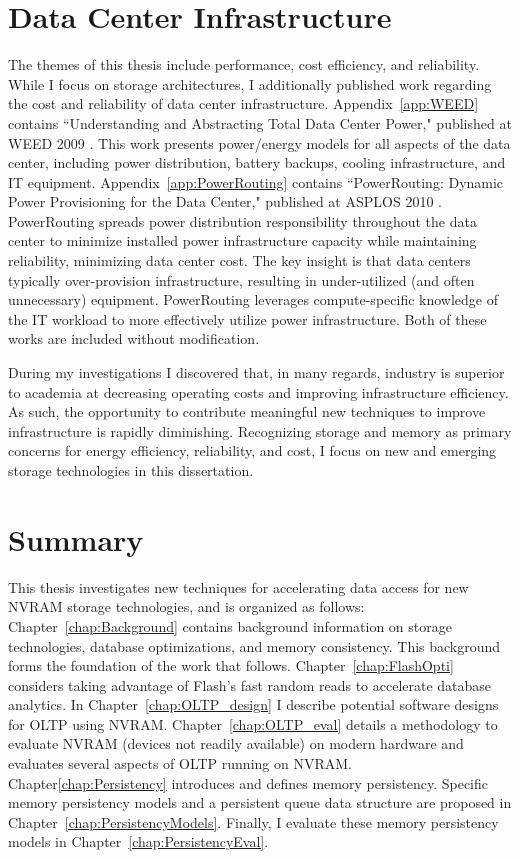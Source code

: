 \section{Data Center Infrastructure}
\label{sec:Intro:Additional}
The themes of this thesis include performance, cost efficiency, and reliability.
While I focus on storage architectures, I additionally published work regarding the cost and reliability of data center infrastructure.
Appendix~\ref{app:WEED} contains ``Understanding and Abstracting Total Data Center Power," published at WEED 2009 \cite{PelleyMeisner09}.
This work presents power/energy models for all aspects of the data center, including power distribution, battery backups, cooling infrastructure, and IT equipment.
Appendix~\ref{app:PowerRouting} contains ``PowerRouting: Dynamic Power Provisioning for the Data Center," published at ASPLOS 2010 \cite{PelleyMeisner10}.
PowerRouting spreads power distribution responsibility throughout the data center to minimize installed power infrastructure capacity while maintaining reliability, minimizing data center cost.
The key insight is that data centers typically over-provision infrastructure, resulting in under-utilized (and often unnecessary) equipment.
PowerRouting leverages compute-specific knowledge of the IT workload to more effectively utilize power infrastructure.
Both of these works are included without modification.

During my investigations I discovered that, in many regards, industry is superior to academia at decreasing operating costs and improving infrastructure efficiency.
As such, the opportunity to contribute meaningful new techniques to improve infrastructure is rapidly diminishing.
Recognizing storage and memory as primary concerns for energy efficiency, reliability, and cost, I focus on new and emerging storage technologies in this dissertation.

\section{Summary}
\label{sec:Intro:Summary}
This thesis investigates new techniques for accelerating data access for new NVRAM storage technologies, and is organized as follows:
Chapter~\ref{chap:Background} contains background information on storage technologies, database optimizations, and memory consistency.
This background forms the foundation of the work that follows.
Chapter~\ref{chap:FlashOpti} considers taking advantage of Flash's fast random reads to accelerate database analytics.
In Chapter~\ref{chap:OLTP_design} I describe potential software designs for OLTP using NVRAM.
Chapter~\ref{chap:OLTP_eval} details a methodology to evaluate NVRAM (devices not readily available) on modern hardware and evaluates several aspects of OLTP running on NVRAM.
Chapter\ref{chap:Persistency} introduces and defines memory persistency.
Specific memory persistency models and a persistent queue data structure are proposed in Chapter~\ref{chap:PersistencyModels}.
Finally, I evaluate these memory persistency models in Chapter~\ref{chap:PersistencyEval}.
